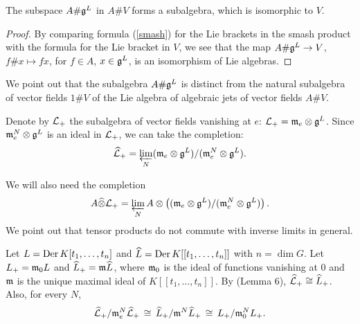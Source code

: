 \documentclass[12pt]{amsart}
\begin{document}
\begin{lemma}
\label{V}
The subspace $A \# \mathfrak{g}^L$ in $A \# V$ forms a subalgebra, which is isomorphic to $V$.
\end{lemma}
\begin{proof}
By comparing formula (\ref{smash}) for the Lie brackets in the smash product with the formula for the Lie bracket in $V$, we see that the map $A \# \mathfrak{g}^L \rightarrow V$, $f \# x \mapsto fx$, for $f\in A$, $x \in \mathfrak{g}^L$, is an isomorphism of Lie algebras.
\end{proof}

We point out that the subalgebra $A \# \mathfrak{g}^L$ is distinct from the natural subalgebra of vector fields $1 \# V$ of the Lie algebra of algebraic jets of vector fields $A \# V$.

Denote by ${\mathcal L}_+$ the subalgebra of vector fields vanishing at $e$: 
${\mathcal L}_+ = \mathfrak{m}_e \otimes \mathfrak{g}^L$. Since $\mathfrak{m}_e^N \otimes \mathfrak{g}^L$ is an ideal in ${\mathcal L}_+$, we can take the completion: 
$$\widehat{\mathcal L}_+ = \varprojlim_N (\mathfrak{m}_e \otimes \mathfrak{g}^L) / (\mathfrak{m}_e^N \otimes \mathfrak{g}^L).$$

We will also need the completion 
$$A \widehat\otimes {\mathcal L}_+ = \varprojlim_N A \otimes \left( (\mathfrak{m}_e \otimes \mathfrak{g}^L) / (\mathfrak{m}_e^N \otimes \mathfrak{g}^L) \right).$$
We point out that tensor products do not commute with inverse limits in general.

Let $L = \textup{Der\,} K[t_1, \ldots, t_n]$ and 
$\widehat{L} = \textup{Der\,} K[[t_1, \ldots, t_n]]$ with $n = \dim G$. Let $L_+ = \mathfrak{m}_0 L$ and
$\widehat{L}_+ = \mathfrak{m} \widehat{L}$, 
where $\mathfrak{m}_0$ is the ideal of functions vanishing at $0$ and
$\mathfrak{m}$ is the unique maximal ideal of $K[[t_1, \ldots, t_n]]$.
By \cite{BFN} (Lemma 6), $\widehat{\mathcal L}_+ \cong \widehat{L}_+$.  
Also, for every $N$, 
$$\widehat{\mathcal L}_+ / \mathfrak{m}_e^N \widehat{\mathcal L}_+ \,\cong\, \widehat{L}_+ / \mathfrak{m}^N \widehat{L}_+ \,\cong\, L_+ / \mathfrak{m}_0^N L_+.$$
\end{document}
